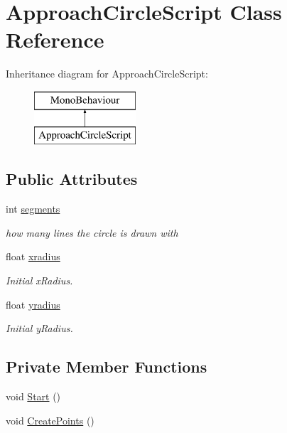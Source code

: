 \hypertarget{class_approach_circle_script}{}\section{Approach\+Circle\+Script Class Reference}
\label{class_approach_circle_script}
Inheritance diagram for Approach\+Circle\+Script\+:\begin{figure}[H]
\begin{center}
\leavevmode
\includegraphics[height=2.000000cm]{class_approach_circle_script}
\end{center}
\end{figure}
\subsection*{Public Attributes}
\begin{DoxyCompactItemize}
\item 
\mbox{\label{class_approach_circle_script_a49c18e052d6500a72c2be8995c3804d7}} 
int \hyperlink{class_approach_circle_script_a49c18e052d6500a72c2be8995c3804d7}{segments}
\begin{DoxyCompactList}\small\item\em how many lines the circle is drawn with \end{DoxyCompactList}\item 
float \hyperlink{class_approach_circle_script_a5fe6dbba38877928ecd860156f44f68e}{xradius}
\begin{DoxyCompactList}\small\item\em Initial x\+Radius. \end{DoxyCompactList}\item 
float \hyperlink{class_approach_circle_script_a29314cfa6de27bac0b214a8be7834820}{yradius}
\begin{DoxyCompactList}\small\item\em Initial y\+Radius. \end{DoxyCompactList}\end{DoxyCompactItemize}
\subsection*{Private Member Functions}
\begin{DoxyCompactItemize}
\item 
void \hyperlink{class_approach_circle_script_a7fd2d08d8cf97264691ec5801f420dc4}{Start} ()
\item 
void \hyperlink{class_approach_circle_script_af02f62c7e58fbdfba5041a3f8b103faf}{Create\+Points} ()
\end{DoxyCompactItemize}
